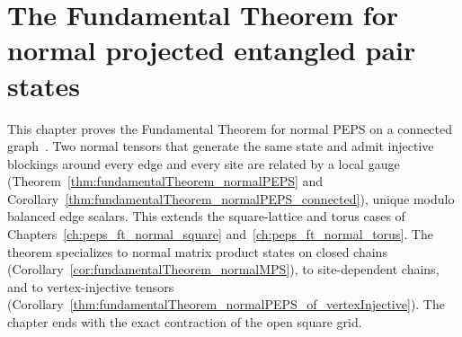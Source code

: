 \chapter{The Fundamental Theorem for normal projected entangled pair states}
\label{ch:peps_ft_normal}

This chapter proves the Fundamental Theorem for normal PEPS on a connected
graph~\cite{Molnar2018NormalPEPS}. Two normal tensors that generate the same
state and admit injective blockings around every edge and every site are
related by a local gauge (Theorem~\ref{thm:fundamentalTheorem_normalPEPS} and
Corollary~\ref{thm:fundamentalTheorem_normalPEPS_connected}), unique modulo
balanced edge scalars. This extends the square-lattice and torus cases of
Chapters~\ref{ch:peps_ft_normal_square} and~\ref{ch:peps_ft_normal_torus}. The
theorem specializes to normal matrix product states on closed chains
(Corollary~\ref{cor:fundamentalTheorem_normalMPS}), to site-dependent chains,
and to vertex-injective tensors
(Corollary~\ref{thm:fundamentalTheorem_normalPEPS_of_vertexInjective}). The
chapter ends with the exact contraction of the open square grid.





